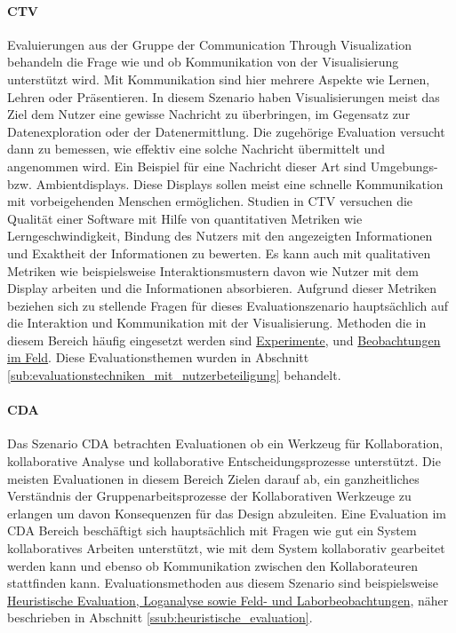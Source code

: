 \documentclass[draft=false
              ,paper=a4
              ,twoside=false
              ,fontsize=11pt
              ,headsepline
              ,BCOR10mm
              ,DIV11
              ]{scrbook}
\begin{document}
\paragraph{CTV} %
\label{par:ctv}
Evaluierungen aus der Gruppe der Communication Through Visualization behandeln die Frage wie und ob Kommunikation von der Visualisierung unterstützt wird. Mit Kommunikation sind hier mehrere Aspekte wie Lernen, Lehren oder Präsentieren. In diesem Szenario haben Visualisierungen meist das Ziel dem Nutzer eine gewisse Nachricht zu überbringen, im Gegensatz zur Datenexploration oder der Datenermittlung. Die zugehörige Evaluation versucht dann zu bemessen, wie effektiv eine solche Nachricht übermittelt und angenommen wird. Ein Beispiel für eine Nachricht dieser Art sind Umgebungs- bzw. Ambientdisplays. Diese Displays sollen meist eine schnelle Kommunikation mit vorbeigehenden Menschen ermöglichen. Studien in CTV versuchen die Qualität einer Software mit Hilfe von quantitativen Metriken wie Lerngeschwindigkeit, Bindung des Nutzers mit den angezeigten Informationen und Exaktheit der Informationen zu bewerten. Es kann auch mit qualitativen Metriken wie beispielsweise Interaktionsmustern davon wie Nutzer mit dem Display arbeiten und die Informationen absorbieren. Aufgrund dieser Metriken beziehen sich zu stellende Fragen für dieses Evaluationszenario hauptsächlich auf die Interaktion und Kommunikation mit der Visualisierung. Methoden die in diesem Bereich häufig eingesetzt werden sind \hyperref[ssub:empirische_techniken_auf_grundlage_von_experimenten]{Experimente},  und \hyperref[sub:evaluationstechniken_mit_nutzerbeteiligung]{Beobachtungen im Feld}. Diese Evaluationsthemen wurden in Abschnitt \ref{sub:evaluationstechniken_mit_nutzerbeteiligung} behandelt.

\paragraph{CDA} %
\label{par:cda}
Das Szenario CDA betrachten Evaluationen ob ein Werkzeug für Kollaboration, kollaborative Analyse und kollaborative Entscheidungsprozesse unterstützt. Die meisten Evaluationen in diesem Bereich Zielen darauf ab, ein ganzheitliches Verständnis der Gruppenarbeitsprozesse der Kollaborativen Werkzeuge zu erlangen um davon Konsequenzen für das Design abzuleiten. Eine Evaluation im CDA Bereich beschäftigt sich hauptsächlich mit Fragen wie gut ein System kollaboratives Arbeiten unterstützt, wie mit dem System kollaborativ gearbeitet werden kann und ebenso ob Kommunikation zwischen den Kollaborateuren stattfinden kann. Evaluationsmethoden aus diesem Szenario sind beispielsweise \hyperref[par:cooperative_evaluation]{Heuristische Evaluation, Loganalyse sowie Feld- und Laborbeobachtungen}, näher beschrieben in Abschnitt \ref{ssub:heuristische_evaluation}.
\end{document}
